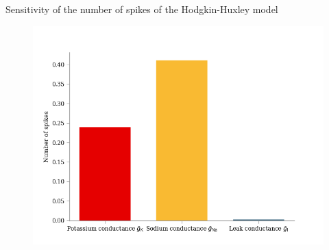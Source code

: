 \documentclass[presentation]{beamer}
\begin{document}
\begin{frame}{Sensitivity of the number of spikes of the Hodgkin-Huxley model}
  \vspace{-5mm}

  \begin{figure}
      \includegraphics[width=1\textwidth]{nr_spikes_sensitivity.png}
  \end{figure}

\end{frame}


\end{document}
